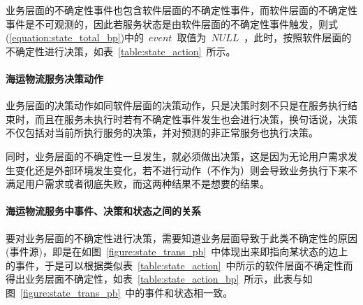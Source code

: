 业务层面的不确定性事件也包含软件层面的不确定性事件，而软件层面的不确定性事件是不可观测的，因此若服务状态是由软件层面的不确定性事件触发，则式(\ref{equation:state_total_bp})中的~$event$~取值为~$NULL$~，此时，按照软件层面的不确定性进行决策，如表~\ref{table:state_action}~所示。

\paragraph{海运物流服务决策动作}

业务层面的决策动作如同软件层面的决策动作，只是决策时刻不只是在服务执行结束时，而且在服务未执行时若有不确定性事件发生也会进行决策，换句话说，决策不仅包括对当前所执行服务的决策，并对预测的非正常服务也执行决策。

同时，业务层面的不确定性一旦发生，就必须做出决策，这是因为无论用户需求发生变化还是外部环境发生变化，若不进行动作（不作为）则会导致业务执行下来不满足用户需求或者彻底失败，而这两种结果不是想要的结果。

\paragraph{海运物流服务中事件、决策和状态之间的关系}

要对业务层面的不确定性进行决策，需要知道业务层面导致于此类不确定性的原因(事件源)，即是在如图~\ref{figure:state_trans_pb}~中体现出来即指向某状态的边上的事件，于是可以根据类似表~\ref{table:state_action}~中所示的软件层面不确定性而得出业务层面不确定性，如表~\ref{table:state_action_bp}~所示，此表与如图~\ref{figure:state_trans_pb}~中的事件和状态相一致。

